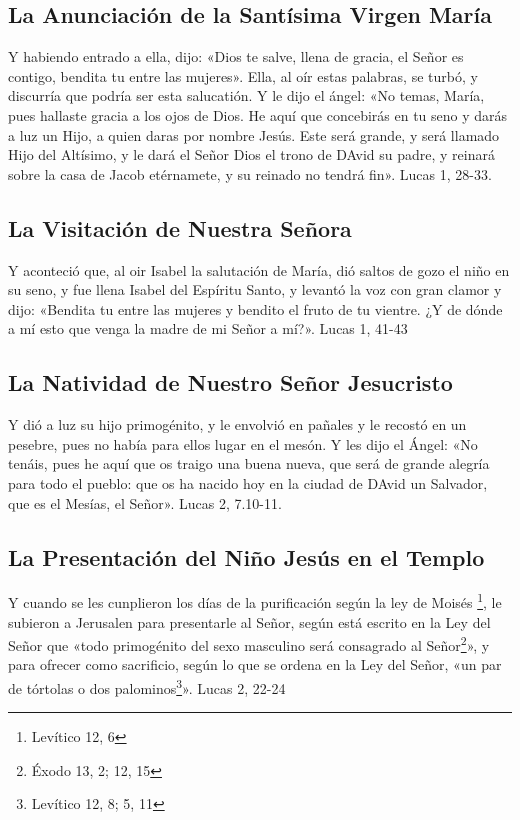 \documentclass[a4paper,11pt, oneside]{report}
\begin{document}
      \subsection{La Anunciación de la Santísima Virgen María}
        Y habiendo entrado a ella, dijo: «Dios te salve, llena de gracia, el Señor es contigo, bendita tu entre las mujeres». Ella, al oír estas palabras, se turbó,
        y discurría que podría ser esta salucatión. Y le dijo el ángel: «No temas, María, pues hallaste gracia a los ojos de Dios. He aquí que concebirás en tu seno
        y darás a luz un Hijo, a quien daras por nombre Jesús. Este será grande, y será llamado Hijo del Altísimo, y le dará el Señor Dios el trono de DAvid su padre,
        y reinará sobre la casa de Jacob etérnamete, y su reinado no tendrá fin». Lucas 1, 28-33\cite{bover-cantera}.

      \subsection{La Visitación de Nuestra Señora}
        Y aconteció que, al oir Isabel la salutación de María, dió saltos de gozo el niño en su seno, y fue llena Isabel del Espíritu Santo, y levantó la voz con gran
        clamor y dijo: «Bendita tu entre las mujeres y bendito el fruto de tu vientre. ¿Y de dónde a mí esto que venga la madre de mi Señor a mí?». 
        Lucas 1, 41-43\cite{bover-cantera}
                      
      \subsection{La Natividad de Nuestro Señor Jesucristo}
        Y dió a luz su hijo primogénito, y le envolvió en pañales y le recostó en un pesebre, pues no había para ellos lugar en el mesón.
        Y les dijo el Ángel: «No tenáis, pues he aquí que os traigo una buena nueva, que será de grande alegría para todo el pueblo: que os ha nacido hoy en la ciudad de DAvid
        un Salvador, que es el Mesías, el Señor». Lucas 2, 7.10-11\cite{bover-cantera}.
    
      \subsection{La Presentación del Niño Jesús en el Templo}
        Y cuando se les cunplieron los días de la purificación según la ley de Moisés \footnote{Levítico 12, 6}, le subieron a Jerusalen para presentarle al Señor, según está escrito
        en la Ley del Señor que «todo primogénito del sexo masculino será consagrado al Señor\footnote{Éxodo 13, 2; 12, 15}», y para ofrecer como sacrificio, según lo que 
        se ordena en la Ley del Señor, «un par de tórtolas o dos palominos\footnote{Levítico 12, 8; 5, 11}». Lucas 2, 22-24
              
\end{document}
